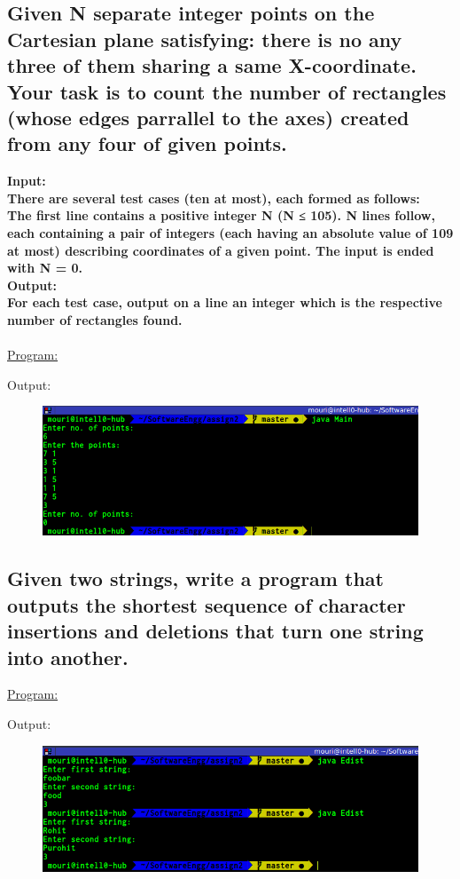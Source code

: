 \documentclass[a4paper,11pt]{article}
\begin{document}
\subsection{Given N separate integer points on the Cartesian plane satisfying: there is no any three of them sharing a same X-coordinate. Your task is to count the number of rectangles (whose edges parrallel to the axes) created from any four of given points.}
\textbf{\large Input:\\
There are several test cases (ten at most), each formed as follows:\\
The first line contains a positive integer N (N ≤ 105).
N lines follow, each containing a pair of integers (each having an absolute value of 109 at most) describing coordinates of a given point. The input is ended with N = 0.\\
Output:\\
For each test case, output on a line an integer which is the respective number of rectangles found.}\\\\
\underline{Program:}

Output:
\begin{figure}[H]
\centering
\includegraphics[width=350pt,height=\textheight,keepaspectratio]{./pics/Java/4.png}
\end{figure}

\bigskip

\subsection{Given two strings, write a program that outputs the shortest sequence of character insertions and deletions that turn one string into another.}
\underline{Program:}

Output:
\begin{figure}[H]
\centering
\includegraphics[width=350pt,height=\textheight,keepaspectratio]{./pics/Java/5.png}
\end{figure}
\end{document}
